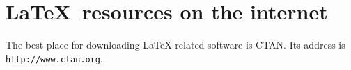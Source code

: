 \documentclass{article}
\begin{document}
	\section{\textsf{\LaTeX\ resources on the internet}}
	The best place for downloading LaTeX related software is CTAN.
	Its address is \texttt{http://www.ctan.org}.
\end{document}
